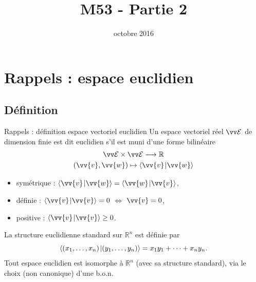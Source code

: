 \documentclass[bigger]{m53beamer}
\title{M53 - Partie 2}
\date{octobre 2016}
\begin{document}
\begin{frame}
  \titlepage
\end{frame}

\section{Rappels : espace euclidien}
\subsection{Définition}
\begin{frame}{Rappels : définition espace vectoriel euclidien}
  Un espace vectoriel réel $\ev{E}$ de dimension finie est dit \alert{euclidien} s'il est muni d'une forme bilinéaire
    \begin{gather*}
      \ev{E} \times \ev{E} \longrightarrow \mathbb{R}\\
      (\vv{v},\vv{w}) \mapsto \scalprod{\vv{v}}{\vv{w}}
    \end{gather*}\vspace*{-1.4\baselineskip}
    \begin{itemize}[<+(1)->]
      \item symétrique : $\scalprod{\vv{v}}{\vv{w}} = \scalprod{\vv{w}}{\vv{v}}$,
      \item définie : $\scalprod{\vv{v}}{\vv{v}} = 0$ $\Leftrightarrow$ $\vv{v} = 0$,
      \item positive : $\scalprod{\vv{v}}{\vv{v}} \geq 0$.
    \end{itemize}\pause
  La structure euclidienne standard sur $\mathbb{R}^{n}$ est définie par
  \vspace*{-.7\baselineskip}
  \[
    \langle{(x_{1},\ldots,x_{n})}\kern1pt |{(y_{1},\ldots,y_{n})}\rangle=x_{1}y_{1}+\cdots+x_{n}y_{n}.
  \]\pause
  Tout espace euclidien est isomorphe à $\mathbb{R}^{n}$ (avec sa structure standard),\pause
  via le choix (non canonique) d'une b.o.n.
\end{frame}

\end{document}
